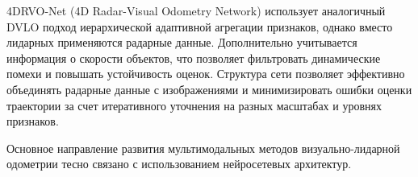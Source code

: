 4DRVO-Net (4D Radar-Visual Odometry Network) использует аналогичный DVLO подход 
иерархической адаптивной агрегации признаков, однако вместо лидарных применяются 
радарные данные. Дополнительно учитывается информация о скорости объектов, что 
позволяет фильтровать динамические помехи и повышать устойчивость оценок. 
Структура сети позволяет эффективно объединять радарные данные с изображениями 
и минимизировать ошибки оценки траектории за счет итеративного уточнения на разных 
масштабах и уровнях признаков.

Основное направление развития мультимодальных методов визуально-лидарной одометрии
тесно связано с использованием нейросетевых архитектур.



